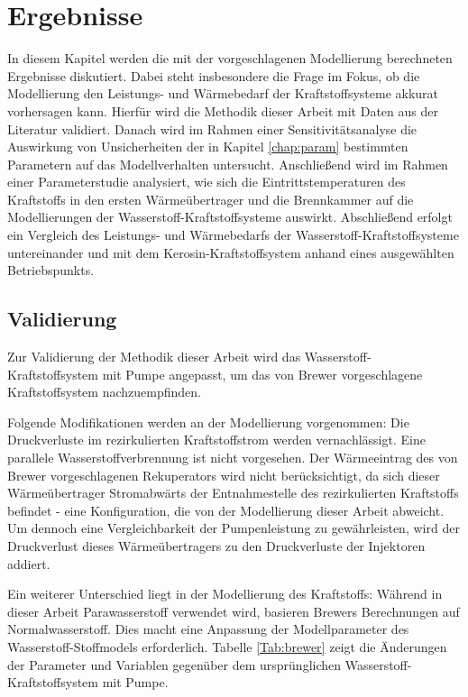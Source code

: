 \chapter{Ergebnisse} \label{chap:ergebnis}

In diesem Kapitel werden die mit der vorgeschlagenen Modellierung berechneten Ergebnisse diskutiert. Dabei steht insbesondere die Frage im Fokus, ob die Modellierung den Leistungs- und Wärmebedarf der Kraftstoffsysteme akkurat vorhersagen kann. Hierfür wird die Methodik dieser Arbeit mit Daten aus der Literatur validiert. Danach wird im Rahmen einer Sensitivitätsanalyse die Auswirkung von Unsicherheiten der in Kapitel \ref{chap:param} bestimmten Parametern auf das Modellverhalten untersucht. Anschließend wird im Rahmen einer Parameterstudie analysiert, wie sich die Eintrittstemperaturen des Kraftstoffs in den ersten Wärmeübertrager und die Brennkammer auf die Modellierungen der Wasserstoff-Kraftstoffsysteme auswirkt. Abschließend erfolgt ein Vergleich des Leistungs- und Wärmebedarfs der Wasserstoff-Kraftstoffsysteme untereinander und mit dem Kerosin-Kraftstoffsystem anhand eines ausgewählten Betriebspunkts.

\section{Validierung}

Zur Validierung der Methodik dieser Arbeit wird das Wasserstoff-Kraftstoffsystem mit Pumpe angepasst, um das von Brewer \cite{Brewer.1991} vorgeschlagene Kraftstoffsystem nachzuempfinden. 

Folgende Modifikationen werden an der Modellierung vorgenommen: Die Druckverluste im rezirkulierten Kraftstoffstrom werden vernachlässigt. Eine parallele Wasserstoffverbrennung ist nicht vorgesehen. Der Wärmeeintrag des von Brewer vorgeschlagenen Rekuperators wird nicht berücksichtigt, da sich dieser Wärmeübertrager Stromabwärts der Entnahmestelle des rezirkulierten Kraftstoffs befindet - eine Konfiguration, die von der Modellierung dieser Arbeit abweicht. Um dennoch eine Vergleichbarkeit der Pumpenleistung zu gewährleisten, wird der Druckverlust dieses Wärmeübertragers zu den Druckverluste der Injektoren addiert. 

Ein weiterer Unterschied liegt in der Modellierung des Kraftstoffs: Während in dieser Arbeit Parawasserstoff verwendet wird, basieren Brewers Berechnungen auf Normalwasserstoff. Dies macht eine Anpassung der Modellparameter des Wasserstoff-Stoffmodels erforderlich. Tabelle \ref{Tab:brewer} zeigt die Änderungen der Parameter und Variablen gegenüber dem ursprünglichen Wasserstoff-Kraftstoffsystem mit Pumpe.

